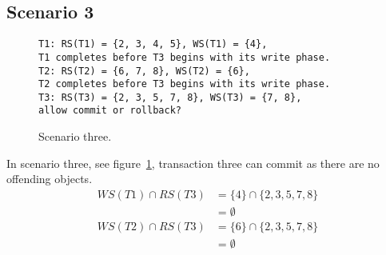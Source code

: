 \documentclass[a4paper]{article}
\begin{document}
\subsection*{Scenario 3}
\begin{figure}[h!]
\texttt{T1: RS(T1) = \{2, 3, 4, 5\}, WS(T1) = \{4\},\\
T1 completes before T3 begins with its write phase.\\
T2: RS(T2) = \{6, 7, 8\}, WS(T2) = \{6\},\\
T2 completes before T3 begins with its write phase.\\
T3: RS(T3) = \{2, 3, 5, 7, 8\}, WS(T3) = \{7, 8\},\\
allow commit or rollback?}
\caption{Scenario three.}
\label{sc3}
\end{figure}
In scenario three, see figure~\ref{sc3}, transaction three can commit as there are no offending objects.
\begin{align}
WS(T1) \cap RS(T3) &= \{4\} \cap \{2, 3, 5, 7, 8\}\\
&= \emptyset\\
WS(T2) \cap RS(T3) &= \{6\} \cap \{2, 3, 5, 7, 8\}\\
&= \emptyset
\end{align}
\end{document}
